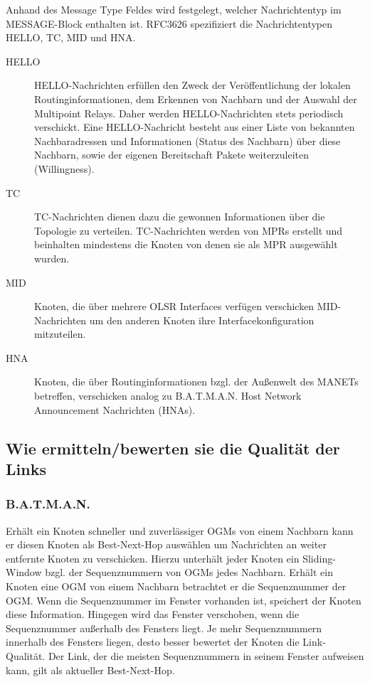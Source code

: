 \documentclass[a4paper,10pt]{article}
\begin{document}
Anhand des Message Type Feldes wird festgelegt, welcher Nachrichtentyp im MESSAGE-Block enthalten ist. 
RFC3626 spezifiziert die Nachrichtentypen HELLO, TC, MID und HNA.

\begin{description}
  \item[HELLO] HELLO-Nachrichten erfüllen den Zweck der Veröffentlichung der lokalen Routinginformationen, dem Erkennen von Nachbarn und der Auswahl der Multipoint Relays. Daher werden HELLO-Nachrichten stets periodisch verschickt. Eine HELLO-Nachricht besteht aus einer Liste von bekannten Nachbaradressen und Informationen (Status des Nachbarn) über diese Nachbarn, sowie der eigenen Bereitschaft Pakete weiterzuleiten (Willingness).
  \item[TC] TC-Nachrichten dienen dazu die gewonnen Informationen über die Topologie zu verteilen. TC-Nachrichten werden von MPRs erstellt und beinhalten mindestens die Knoten von denen sie als MPR ausgewählt wurden.
  \item[MID] Knoten, die über mehrere OLSR Interfaces verfügen verschicken MID-Nachrichten um den anderen Knoten ihre Interfacekonfiguration mitzuteilen.
  \item[HNA] Knoten, die über Routinginformationen bzgl. der Außenwelt des MANETs betreffen, verschicken analog zu B.A.T.M.A.N. Host Network Announcement Nachrichten (HNAs).
\end{description}

\subsection{Wie ermitteln/bewerten sie die Qualität der Links}


\subsubsection*{B.A.T.M.A.N.}

Erhält ein Knoten schneller und zuverlässiger OGMs von einem Nachbarn kann er diesen Knoten als Best-Next-Hop auswählen um Nachrichten an weiter entfernte Knoten zu verschicken.
Hierzu unterhält jeder Knoten ein Sliding-Window bzgl. der Sequenznummern von OGMs jedes Nachbarn. 
Erhält ein Knoten eine OGM von einem Nachbarn betrachtet er die Sequenznummer der OGM.
Wenn die Sequenznummer im Fenster vorhanden ist, speichert der Knoten diese Information.
Hingegen wird das Fenster verschoben, wenn die Sequenznummer außerhalb des Fensters liegt.
Je mehr Sequenznummern innerhalb des Fensters liegen, desto besser bewertet der Knoten die Link-Qualität.
Der Link, der die meisten Sequenznummern in seinem Fenster aufweisen kann, gilt als aktueller Best-Next-Hop.
\end{document}
